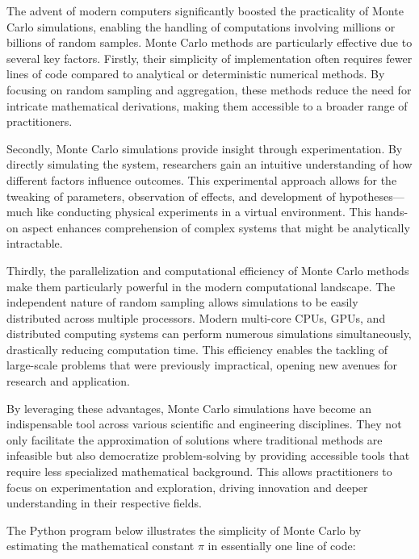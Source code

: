 \documentclass[final,5p,times,twocolumn,authoryear]{elsarticle}
\begin{document}
The advent of modern computers significantly boosted the practicality of Monte Carlo simulations, enabling the handling of computations involving millions or billions of random samples. Monte Carlo methods are particularly effective due to several key factors. Firstly, their simplicity of implementation often requires fewer lines of code compared to analytical or deterministic numerical methods. By focusing on random sampling and aggregation, these methods reduce the need for intricate mathematical derivations, making them accessible to a broader range of practitioners.

Secondly, Monte Carlo simulations provide insight through experimentation. By directly simulating the system, researchers gain an intuitive understanding of how different factors influence outcomes. This experimental approach allows for the tweaking of parameters, observation of effects, and development of hypotheses—much like conducting physical experiments in a virtual environment. This hands-on aspect enhances comprehension of complex systems that might be analytically intractable.

Thirdly, the parallelization and computational efficiency of Monte Carlo methods make them particularly powerful in the modern computational landscape. The independent nature of random sampling allows simulations to be easily distributed across multiple processors. Modern multi-core CPUs, GPUs, and distributed computing systems can perform numerous simulations simultaneously, drastically reducing computation time. This efficiency enables the tackling of large-scale problems that were previously impractical, opening new avenues for research and application.

By leveraging these advantages, Monte Carlo simulations have become an indispensable tool across various scientific and engineering disciplines. They not only facilitate the approximation of solutions where traditional methods are infeasible but also democratize problem-solving by providing accessible tools that require less specialized mathematical background. This allows practitioners to focus on experimentation and exploration, driving innovation and deeper understanding in their respective fields.

The Python program below illustrates the simplicity of Monte Carlo by estimating the mathematical constant $\pi$ in essentially one line of code:
\end{document}
